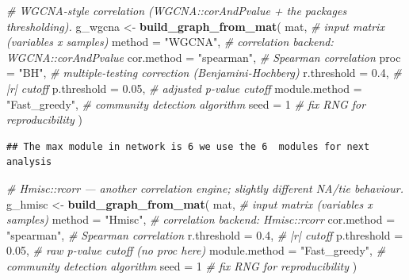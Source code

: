 \documentclass[
]{book}
\newenvironment{Shaded}{\begin{snugshade}}{\end{snugshade}}
\newcommand{\AttributeTok}[1]{\textcolor[rgb]{0.13,0.29,0.53}{#1}}
\newcommand{\CommentTok}[1]{\textcolor[rgb]{0.56,0.35,0.01}{\textit{#1}}}
\newcommand{\DecValTok}[1]{\textcolor[rgb]{0.00,0.00,0.81}{#1}}
\newcommand{\FloatTok}[1]{\textcolor[rgb]{0.00,0.00,0.81}{#1}}
\newcommand{\FunctionTok}[1]{\textcolor[rgb]{0.13,0.29,0.53}{\textbf{#1}}}
\newcommand{\NormalTok}[1]{#1}
\newcommand{\OtherTok}[1]{\textcolor[rgb]{0.56,0.35,0.01}{#1}}
\newcommand{\StringTok}[1]{\textcolor[rgb]{0.31,0.60,0.02}{#1}}
\begin{document}
\begin{Shaded}
\begin{Highlighting}[]
\CommentTok{\# WGCNA{-}style correlation (WGCNA::corAndPvalue + the package\textquotesingle{}s thresholding).}
\NormalTok{g\_wgcna }\OtherTok{\textless{}{-}} \FunctionTok{build\_graph\_from\_mat}\NormalTok{(}
\NormalTok{  mat,                              }\CommentTok{\# input matrix (variables x samples)}
  \AttributeTok{method        =} \StringTok{"WGCNA"}\NormalTok{,          }\CommentTok{\# correlation backend: WGCNA::corAndPvalue}
  \AttributeTok{cor.method    =} \StringTok{"spearman"}\NormalTok{,       }\CommentTok{\# Spearman correlation}
  \AttributeTok{proc          =} \StringTok{"BH"}\NormalTok{,             }\CommentTok{\# multiple{-}testing correction (Benjamini{-}Hochberg)}
  \AttributeTok{r.threshold   =} \FloatTok{0.4}\NormalTok{,              }\CommentTok{\# |r| cutoff}
  \AttributeTok{p.threshold   =} \FloatTok{0.05}\NormalTok{,             }\CommentTok{\# adjusted p{-}value cutoff}
  \AttributeTok{module.method =} \StringTok{"Fast\_greedy"}\NormalTok{,    }\CommentTok{\# community detection algorithm}
  \AttributeTok{seed          =} \DecValTok{1}                 \CommentTok{\# fix RNG for reproducibility}
\NormalTok{)}
\end{Highlighting}
\end{Shaded}

\begin{verbatim}
## The max module in network is 6 we use the 6  modules for next analysis
\end{verbatim}

\begin{Shaded}
\begin{Highlighting}[]
\CommentTok{\# Hmisc::rcorr — another correlation engine; slightly different NA/tie behaviour.}
\NormalTok{g\_hmisc }\OtherTok{\textless{}{-}} \FunctionTok{build\_graph\_from\_mat}\NormalTok{(}
\NormalTok{  mat,                              }\CommentTok{\# input matrix (variables x samples)}
  \AttributeTok{method        =} \StringTok{"Hmisc"}\NormalTok{,          }\CommentTok{\# correlation backend: Hmisc::rcorr}
  \AttributeTok{cor.method    =} \StringTok{"spearman"}\NormalTok{,       }\CommentTok{\# Spearman correlation}
  \AttributeTok{r.threshold   =} \FloatTok{0.4}\NormalTok{,              }\CommentTok{\# |r| cutoff}
  \AttributeTok{p.threshold   =} \FloatTok{0.05}\NormalTok{,             }\CommentTok{\# raw p{-}value cutoff (no \textasciigrave{}proc\textasciigrave{} here)}
  \AttributeTok{module.method =} \StringTok{"Fast\_greedy"}\NormalTok{,    }\CommentTok{\# community detection algorithm}
  \AttributeTok{seed          =} \DecValTok{1}                 \CommentTok{\# fix RNG for reproducibility}
\NormalTok{)}
\end{Highlighting}
\end{Shaded}
\end{document}
